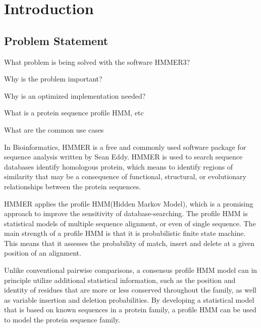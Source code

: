 
\chapter{Introduction} %



\section{Problem Statement}

What problem is being solved with the software HMMER3?

Why is the problem important?

Why is an optimized implementation needed?

What is a protein sequence profile HMM, etc

What are the common use cases



In Bioinformatics, HMMER \citep{HMMER} is a free and commonly used software package for sequence analysis written by Sean Eddy. 
HMMER is used to search sequence databases identify homologous protein, which means to identify regions of similarity that may be a consequence of functional, structural, or evolutionary relationships between the protein sequences.

HMMER applies the profile HMM(Hidden Markov Model), which is a promising approach to improve the sensitivity of database-searching. The profile HMM is statistical models of multiple sequence alignment, or even of single sequence. The main strength of a profile HMM is that it is probabilistic finite state machine. This means that it assesses the probability of match, insert and delete at a given position of an alignment.

Unlike conventional pairwise comparisons, a consensus profile HMM model can in principle utilize additional statistical information, such as the position and identity of residues that are more or less conserved throughout the family, as well as variable insertion and deletion probabilities. By developing a statistical model that is based on known sequences in a protein family, a profile HMM can be used to model the protein sequence family.

